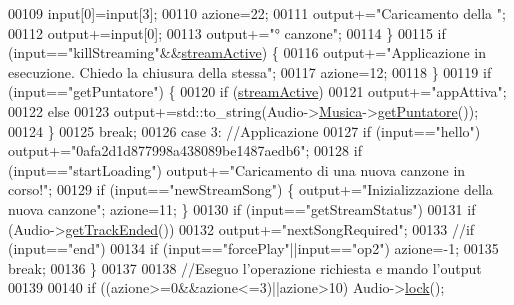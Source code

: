 \begin{DoxyCode}
00109                 input[0]=input[3];
00110                 azione=22;
00111                 output+=\textcolor{stringliteral}{"Caricamento della "};
00112                 output+=input[0];
00113                 output+=\textcolor{stringliteral}{"° canzone"};
00114             \}
00115             \textcolor{keywordflow}{if} (input==\textcolor{stringliteral}{"killStreaming"}&&\hyperlink{classdataManager_a73070a3be96596028b91542367e1ebdd}{streamActive}) \{
00116                 output+=\textcolor{stringliteral}{"Applicazione in esecuzione. Chiedo la chiusura della
       stessa"};
00117                 azione=12;
00118             \}
00119             \textcolor{keywordflow}{if} (input==\textcolor{stringliteral}{"getPuntatore"}) \{
00120                 \textcolor{keywordflow}{if} (\hyperlink{classdataManager_a73070a3be96596028b91542367e1ebdd}{streamActive})
00121                     output+=\textcolor{stringliteral}{"appAttiva"};
00122                 \textcolor{keywordflow}{else}
00123                     output+=std::to\_string(Audio->\hyperlink{classRiproduttore_a373b2d6675abc22dbe61abf2223cacab}{Musica}->\hyperlink{classusbData_a3d872ce11202a145b83f0791d7eefebb}{getPuntatore}());
00124             \}
00125             \textcolor{keywordflow}{break};
00126         \textcolor{keywordflow}{case} 3: \textcolor{comment}{//Applicazione}
00127             \textcolor{keywordflow}{if} (input==\textcolor{stringliteral}{"hello"}) output+=\textcolor{stringliteral}{"0afa2d1d877998a438089be1487aedb6"};
00128             \textcolor{keywordflow}{if} (input==\textcolor{stringliteral}{"startLoading"}) output+=\textcolor{stringliteral}{"Caricamento di una nuova
       canzone in corso!"};
00129             \textcolor{keywordflow}{if} (input==\textcolor{stringliteral}{"newStreamSong"}) \{ output+=\textcolor{stringliteral}{"Inizializzazione della nuova
       canzone"}; azione=11; \}
00130             \textcolor{keywordflow}{if} (input==\textcolor{stringliteral}{"getStreamStatus"})
00131                 \textcolor{keywordflow}{if} (Audio->\hyperlink{classRiproduttore_abf360eff47ce41b498b6d66672225929}{getTrackEnded}())
00132                     output+=\textcolor{stringliteral}{"nextSongRequired"};
00133             \textcolor{comment}{//if (input=="end")}
00134             \textcolor{keywordflow}{if} (input==\textcolor{stringliteral}{"forcePlay"}||input==\textcolor{stringliteral}{"op2"}) azione=-1;
00135             \textcolor{keywordflow}{break};
00136         \}
00137 
00138         \textcolor{comment}{//Eseguo l'operazione richiesta e mando l'output}
00139 
00140         \textcolor{keywordflow}{if} ((azione>=0&&azione<=3)||azione>10) Audio->\hyperlink{classRiproduttore_a87c1d5e97b54d0d4abbd5465adeb7c10}{lock}();

\end{DoxyCode}
